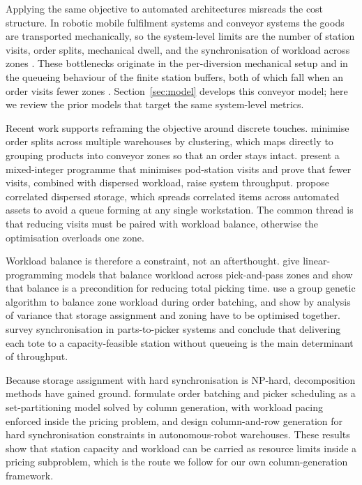 \documentclass[]{interact}
\begin{document}
Applying the same objective to automated architectures misreads the cost structure. In robotic mobile fulfilment systems and conveyor systems the goods are transported mechanically, so the system-level limits are the number of station visits, order splits, mechanical dwell, and the synchronisation of workload across zones \citep{azadeh2019, xie2021}. These bottlenecks originate in the per-diversion mechanical setup and in the queueing behaviour of the finite station buffers, both of which fall when an order visits fewer zones \citep{zhu2021, kim2020}. Section~\ref{sec:model} develops this conveyor model; here we review the prior models that target the same system-level metrics.

Recent work supports reframing the objective around discrete touches. \citet{zhu2021} minimise order splits across multiple warehouses by clustering, which maps directly to grouping products into conveyor zones so that an order stays intact. \citet{xie2021} present a mixed-integer programme that minimises pod-station visits and prove that fewer visits, combined with dispersed workload, raise system throughput. \citet{mirzaei2021} propose correlated dispersed storage, which spreads correlated items across automated assets to avoid a queue forming at any single workstation. The common thread is that reducing visits must be paired with workload balance, otherwise the optimisation overloads one zone.

Workload balance is therefore a constraint, not an afterthought. \citet{tarczynski2023} give linear-programming models that balance workload across pick-and-pass zones and show that balance is a precondition for reducing total picking time. \citet{pan2015} use a group genetic algorithm to balance zone workload during order batching, and \citet{vanGils2018} show by analysis of variance that storage assignment and zoning have to be optimised together. \citet{boysen2023} survey synchronisation in parts-to-picker systems and conclude that delivering each tote to a capacity-feasible station without queueing is the main determinant of throughput.

Because storage assignment with hard synchronisation is NP-hard, decomposition methods have gained ground. \citet{muter2022} formulate order batching and picker scheduling as a set-partitioning model solved by column generation, with workload pacing enforced inside the pricing problem, and \citet{zhen2025} design column-and-row generation for hard synchronisation constraints in autonomous-robot warehouses. These results show that station capacity and workload can be carried as resource limits inside a pricing subproblem, which is the route we follow for our own column-generation framework.
\end{document}
